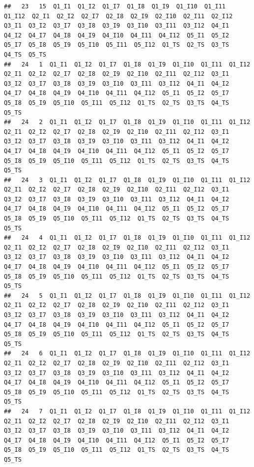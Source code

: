 \documentclass[
]{book}
\begin{document}
\begin{verbatim}
##   23   15  Q1_I1  Q1_I2  Q1_I7  Q1_I8  Q1_I9  Q1_I10  Q1_I11  Q1_I12  Q2_I1  Q2_I2  Q2_I7  Q2_I8  Q2_I9  Q2_I10  Q2_I11  Q2_I12  Q3_I1  Q3_I2  Q3_I7  Q3_I8  Q3_I9  Q3_I10  Q3_I11  Q3_I12  Q4_I1  Q4_I2  Q4_I7  Q4_I8  Q4_I9  Q4_I10  Q4_I11  Q4_I12  Q5_I1  Q5_I2  Q5_I7  Q5_I8  Q5_I9  Q5_I10  Q5_I11  Q5_I12  Q1_TS  Q2_TS  Q3_TS  Q4_TS  Q5_TS
##   24   1  Q1_I1  Q1_I2  Q1_I7  Q1_I8  Q1_I9  Q1_I10  Q1_I11  Q1_I12  Q2_I1  Q2_I2  Q2_I7  Q2_I8  Q2_I9  Q2_I10  Q2_I11  Q2_I12  Q3_I1  Q3_I2  Q3_I7  Q3_I8  Q3_I9  Q3_I10  Q3_I11  Q3_I12  Q4_I1  Q4_I2  Q4_I7  Q4_I8  Q4_I9  Q4_I10  Q4_I11  Q4_I12  Q5_I1  Q5_I2  Q5_I7  Q5_I8  Q5_I9  Q5_I10  Q5_I11  Q5_I12  Q1_TS  Q2_TS  Q3_TS  Q4_TS  Q5_TS
##   24   2  Q1_I1  Q1_I2  Q1_I7  Q1_I8  Q1_I9  Q1_I10  Q1_I11  Q1_I12  Q2_I1  Q2_I2  Q2_I7  Q2_I8  Q2_I9  Q2_I10  Q2_I11  Q2_I12  Q3_I1  Q3_I2  Q3_I7  Q3_I8  Q3_I9  Q3_I10  Q3_I11  Q3_I12  Q4_I1  Q4_I2  Q4_I7  Q4_I8  Q4_I9  Q4_I10  Q4_I11  Q4_I12  Q5_I1  Q5_I2  Q5_I7  Q5_I8  Q5_I9  Q5_I10  Q5_I11  Q5_I12  Q1_TS  Q2_TS  Q3_TS  Q4_TS  Q5_TS
##   24   3  Q1_I1  Q1_I2  Q1_I7  Q1_I8  Q1_I9  Q1_I10  Q1_I11  Q1_I12  Q2_I1  Q2_I2  Q2_I7  Q2_I8  Q2_I9  Q2_I10  Q2_I11  Q2_I12  Q3_I1  Q3_I2  Q3_I7  Q3_I8  Q3_I9  Q3_I10  Q3_I11  Q3_I12  Q4_I1  Q4_I2  Q4_I7  Q4_I8  Q4_I9  Q4_I10  Q4_I11  Q4_I12  Q5_I1  Q5_I2  Q5_I7  Q5_I8  Q5_I9  Q5_I10  Q5_I11  Q5_I12  Q1_TS  Q2_TS  Q3_TS  Q4_TS  Q5_TS
##   24   4  Q1_I1  Q1_I2  Q1_I7  Q1_I8  Q1_I9  Q1_I10  Q1_I11  Q1_I12  Q2_I1  Q2_I2  Q2_I7  Q2_I8  Q2_I9  Q2_I10  Q2_I11  Q2_I12  Q3_I1  Q3_I2  Q3_I7  Q3_I8  Q3_I9  Q3_I10  Q3_I11  Q3_I12  Q4_I1  Q4_I2  Q4_I7  Q4_I8  Q4_I9  Q4_I10  Q4_I11  Q4_I12  Q5_I1  Q5_I2  Q5_I7  Q5_I8  Q5_I9  Q5_I10  Q5_I11  Q5_I12  Q1_TS  Q2_TS  Q3_TS  Q4_TS  Q5_TS
##   24   5  Q1_I1  Q1_I2  Q1_I7  Q1_I8  Q1_I9  Q1_I10  Q1_I11  Q1_I12  Q2_I1  Q2_I2  Q2_I7  Q2_I8  Q2_I9  Q2_I10  Q2_I11  Q2_I12  Q3_I1  Q3_I2  Q3_I7  Q3_I8  Q3_I9  Q3_I10  Q3_I11  Q3_I12  Q4_I1  Q4_I2  Q4_I7  Q4_I8  Q4_I9  Q4_I10  Q4_I11  Q4_I12  Q5_I1  Q5_I2  Q5_I7  Q5_I8  Q5_I9  Q5_I10  Q5_I11  Q5_I12  Q1_TS  Q2_TS  Q3_TS  Q4_TS  Q5_TS
##   24   6  Q1_I1  Q1_I2  Q1_I7  Q1_I8  Q1_I9  Q1_I10  Q1_I11  Q1_I12  Q2_I1  Q2_I2  Q2_I7  Q2_I8  Q2_I9  Q2_I10  Q2_I11  Q2_I12  Q3_I1  Q3_I2  Q3_I7  Q3_I8  Q3_I9  Q3_I10  Q3_I11  Q3_I12  Q4_I1  Q4_I2  Q4_I7  Q4_I8  Q4_I9  Q4_I10  Q4_I11  Q4_I12  Q5_I1  Q5_I2  Q5_I7  Q5_I8  Q5_I9  Q5_I10  Q5_I11  Q5_I12  Q1_TS  Q2_TS  Q3_TS  Q4_TS  Q5_TS
##   24   7  Q1_I1  Q1_I2  Q1_I7  Q1_I8  Q1_I9  Q1_I10  Q1_I11  Q1_I12  Q2_I1  Q2_I2  Q2_I7  Q2_I8  Q2_I9  Q2_I10  Q2_I11  Q2_I12  Q3_I1  Q3_I2  Q3_I7  Q3_I8  Q3_I9  Q3_I10  Q3_I11  Q3_I12  Q4_I1  Q4_I2  Q4_I7  Q4_I8  Q4_I9  Q4_I10  Q4_I11  Q4_I12  Q5_I1  Q5_I2  Q5_I7  Q5_I8  Q5_I9  Q5_I10  Q5_I11  Q5_I12  Q1_TS  Q2_TS  Q3_TS  Q4_TS  Q5_TS

\end{verbatim}
\end{document}
